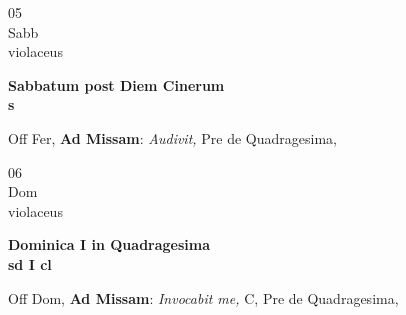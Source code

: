 \documentclass[10pt, openany]{book}
\begin{document}
        \begin{center}
            \begin{minipage}{3.5in}
                \vspace{2em}
                \begin{minipage}{0.5in}
                    {\Huge 05} \\
                    {\normalsize Sabb} \\
                    {\normalsize violaceus}
                \end{minipage}
                \begin{minipage}{3.0in}
                    \textbf{ \large Sabbatum post Diem Cinerum \\
                    \textnormal{\normalsize s}} \\ 
                \end{minipage}
                \begin{justify}Off Fer, \textbf{Ad Missam}: \textit{Audivit,} Pre de Quadragesima,  
                \end{justify}
            \end{minipage}
        \end{center}
    
        \begin{center}
            \begin{minipage}{3.5in}
                \vspace{2em}
                \begin{minipage}{0.5in}
                    {\Huge 06} \\
                    {\normalsize Dom} \\
                    {\normalsize violaceus}
                \end{minipage}
                \begin{minipage}{3.0in}
                    \textbf{ \large Dominica I in Quadragesima \\
                    \textnormal{\normalsize sd I cl}} \\ 
                \end{minipage}
                \begin{justify}Off Dom, \textbf{Ad Missam}: \textit{Invocabit me,} C, Pre de Quadragesima,  
                \end{justify}
            \end{minipage}
        \end{center}
    
\end{document}
